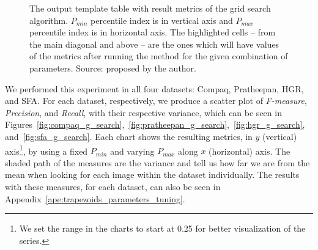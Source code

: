 \begin{figure}[ht]
    \centering

    \caption[The output template table with result metrics of the grid search algorithm]{The output template table with result metrics of the grid search algorithm. $P_{min}$ percentile index is in vertical axis and $P_{max}$ percentile index is in horizontal axis. The highlighted cells -- from the main diagonal and above -- are the ones which will have values of the metrics after running the method for the given combination of parameters. Source: proposed by the author.}
    \label{fig:gs_table_output}
\end{figure}

We performed this experiment in all four datasets: Compaq, Pratheepan, HGR, and SFA. For each dataset, respectively, we produce a scatter plot of \emph{F-measure}, \emph{Precision}, and \emph{Recall}, with their respective variance, which can be seen in Figures~\ref{fig:compaq_g_search},~\ref{fig:pratheepan_g_search},~\ref{fig:hgr_g_search}, and~\ref{fig:sfa_g_search}. Each chart shows the resulting metrics, in $y$ (vertical) axis\footnote{We set the range in the charts to start at 0.25 for better visualization of the series.
}, by using a fixed $P_{min}$ and varying $P_{max}$ along $x$ (horizontal) axis. The shaded path of the measures are the variance and tell us how far we are from the mean when looking for each image within the dataset individually. The results with these measures, for each dataset, can also be seen in Appendix~\ref{ape:trapezoids_parameters_tuning}.

